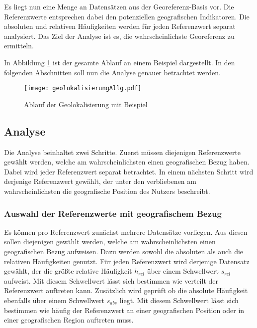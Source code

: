 		Es liegt nun eine Menge an Datensätzen aus der Georeferenz-Basis vor.
		Die Referenzwerte entsprechen dabei den potenziellen geografischen Indikatoren.
		Die absoluten und relativen Häufigkeiten werden für jeden Referenzwert separat analysiert.
		Das Ziel der Analyse ist es, die wahrscheinlichste Georeferenz zu ermitteln.

		In Abbildung \ref{img:ablaufGeolok} ist der gesamte Ablauf an einem Beispiel dargestellt.
		In den folgenden Abschnitten soll nun die Analyse genauer betrachtet werden.

			\begin{figure} 
			\begin{center}
						\texttt{[image: geolokalisierungAllg.pdf]}
						\caption{Ablauf der Geolokalisierung mit Beispiel}
						\label{img:ablaufGeolok}
					\end{center}
			\end{figure}	

		\subsection{Analyse}

			Die Analyse beinhaltet zwei Schritte. 
			Zuerst müssen diejenigen Referenzwerte gewählt werden, welche am wahrscheinlichsten einen geografischen Bezug haben.
			Dabei wird jeder Referenzwert separat betrachtet. 
			In einem nächsten Schritt wird derjenige Referenzwert gewählt, der unter den verbliebenen am wahrscheinlichsten die geografische Position des Nutzers beschreibt. 

			\subsubsection{Auswahl der Referenzwerte mit geografischem Bezug}

				Es können pro Referenzwert zunächst mehrere Datensätze vorliegen.
				Aus diesen sollen diejenigen gewählt werden, welche am wahrscheinlichsten einen geografischen Bezug aufweisen.
				Dazu werden sowohl die absoluten als auch die relativen Häufigkeiten genutzt. 
				Für jeden Referenzwert wird derjenige Datensatz gewählt, der die größte relative Häufigkeit $h_{rel}$ über einem Schwellwert $s_{rel}$ aufweist.
				Mit diesem Schwellwert lässt sich bestimmen wie verteilt der Referenzwert auftreten kann.
				Zusätzlich wird geprüft ob die absolute Häufigkeit ebenfalls über einem Schwellwert $s_{abs}$ liegt.
				Mit diesem Schwellwert lässt sich bestimmen wie häufig der Referenzwert an einer geografischen Position oder in einer geografischen Region auftreten muss. 

